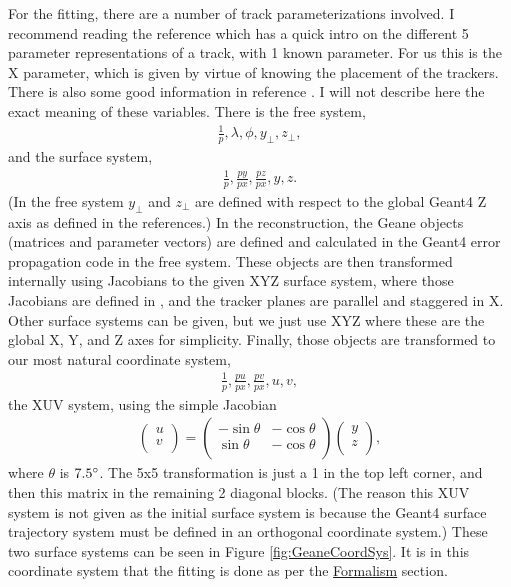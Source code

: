 	For the fitting, there are a number of track parameterizations involved. I recommend reading the reference \cite{geanemanual} which has a quick intro on the different 5 parameter representations of a track, with 1 known parameter. For us this is the X parameter, which is given by virtue of knowing the placement of the trackers. There is also some good information in reference \cite{Lavezzi}. I will not describe here the exact meaning of these variables. There is the free system, 
		\begin{align}
			\frac{1}{p}, \lambda, \phi, y_{\perp}, z_{\perp},
		\end{align}
	and the surface system,
		\begin{align}
			\frac{1}{p}, \frac{py}{px}, \frac{pz}{px}, y, z.
		\end{align}
	(In the free system $y_{\perp}$ and $ z_{\perp}$ are defined with respect to the global Geant4 Z axis as defined in the references.) In the reconstruction, the Geane objects (matrices and parameter vectors) are defined and calculated in the Geant4 error propagation code in the free system. These objects are then transformed internally using Jacobians to the given XYZ surface system, where those Jacobians are defined in \cite{jacob}, and the tracker planes are parallel and staggered in X. Other surface systems can be given, but we just use XYZ where these are the global X, Y, and Z axes for simplicity. Finally, those objects are transformed to our most natural coordinate system,
		\begin{align}
			\frac{1}{p}, \frac{pu}{px}, \frac{pv}{px}, u, v,
		\end{align}
	the XUV system, using the simple Jacobian
		\begin{align}
			\begin{pmatrix}
				u \\
				v \\
			\end{pmatrix} =
			\begin{pmatrix}
				-\sin{\theta} & -\cos{\theta} \\
				\sin{\theta} & -\cos{\theta} \\
			\end{pmatrix}
			\begin{pmatrix}
				y \\
				z \\
			\end{pmatrix},
		\end{align}
	where $\theta$ is $7.5\degree$. The 5x5 transformation is just a 1 in the top left corner, and then this matrix in the remaining 2 diagonal blocks. (The reason this XUV system is not given as the initial surface system is because the Geant4 surface trajectory system must be defined in an orthogonal coordinate system.) These two surface systems can be seen in Figure \ref{fig:GeaneCoordSys}. It is in this coordinate system that the fitting is done as per the \hyperref[sec:Formalism]{Formalism} section.

